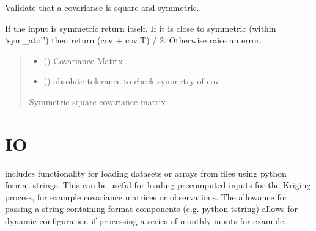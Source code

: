 \documentclass[letterpaper,10pt,english]{sphinxmanual}
\begin{document}

\begin{fulllineitems}
\label{\detokenize{misc:glomar_gridding.covariance_tools.validate_covariance}}
\pysigstartsignatures
\pysiglinewithargsret
{}
{\sphinxparamcomma {}}
{}
\pysigstopsignatures
\sphinxAtStartPar
Validate that a covariance is square and symmetric.

\sphinxAtStartPar
If the input is symmetric return itself. If it is close to symmetric (within
‘sym\_atol’) then return (cov + cov.T) / 2. Otherwise raise an error.
\begin{quote}\begin{description}
\begin{itemize}
\item {}
\sphinxAtStartPar
{} () \textendash{} Covariance Matrix

\item {}
\sphinxAtStartPar
{} () \textendash{} absolute tolerance to check symmetry of cov

\end{itemize}

\sphinxAtStartPar
{} \textendash{} Symmetric square covariance matrix

\sphinxAtStartPar
{}

\end{description}\end{quote}

\end{fulllineitems}



\section{IO}
\label{\detokenize{misc:module-glomar_gridding.io}}\label{\detokenize{misc:io}}
\sphinxAtStartPar
{} includes functionality for loading datasets or arrays from
 files using python format strings. This can be useful for loading
pre\sphinxhyphen{}computed inputs for the Kriging process, for example covariance matrices or
observations. The allowance for passing a string containing format components
(e.g. python t\sphinxhyphen{}string) allows for dynamic configuration if processing a series
of monthly inputs for example.
\end{document}
